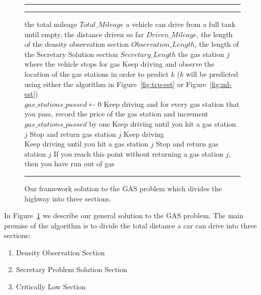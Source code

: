 \begin{figure}[!hbt]
\vspace{0.2cm}
\hrule \medskip {} \smallskip
\hrule
\smallskip
\begin{algorithmic}[1]
 the total mileage $Total\_Mileage$ a vehicle can drive from a full tank until empty, the distance driven so far $Driven\_Mileage$, the length of the density observation section $Observation\_Length$, the length of the Secretary Solution section $Secretary\_Length$
 the gas station $j$ where the vehicle stops for gas 
 \label{alg:line:observation-start}
\STATE Keep driving and observe the location of the gas stations in order to predict $k$ ($k$ will be predicted using either the algorithm in Figure~\ref{fig:tcp-est} or Figure~\ref{fig:ml-est})
\ENDWHILE \label{alg:line:observation-end} \\
\STATE $gas\_stations\_passed \gets 0$ \label{alg:line:secretary-start}
\STATE Keep driving and for every gas station that you pass, record the price of the gas station and increment $gas\_stations\_passed$ by one
\ENDWHILE
{}
\STATE Keep driving until you hit a gas station $j$
\STATE Stop and return gas station $j$
\ELSE
\STATE Keep driving
\ENDIF
\ENDWHILE \label{alg:line:secretary-end} \\
 \label{alg:line:critical-start}
\STATE Keep driving until you hit a gas station $j$
\STATE Stop and return gas station $j$
\ENDWHILE \label{alg:line:critical-end}
\STATE If you reach this point without returning a gas station $j$, then you have run out of gas
\end{algorithmic}
\hrule
\caption{Our framework solution to the GAS problem which divides the highway into three sections.}
\label{fig:CriticalSectionsAlg}
\end{figure}

In Figure~\ref{fig:CriticalSectionsAlg} we describe our general solution to the GAS problem. The main premise of the algorithm is to divide the total distance a car can drive into three sections:
\begin{enumerate}
\item Density Observation Section
\item Secretary Problem Solution Section
\item Critically Low Section
\end{enumerate}

